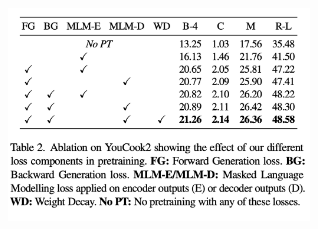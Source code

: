 \documentclass{article}
\begin{document}
\begin{figure}
\includegraphics[width=8cm]{fig3}
\centering
\end{figure}
\end{document}
